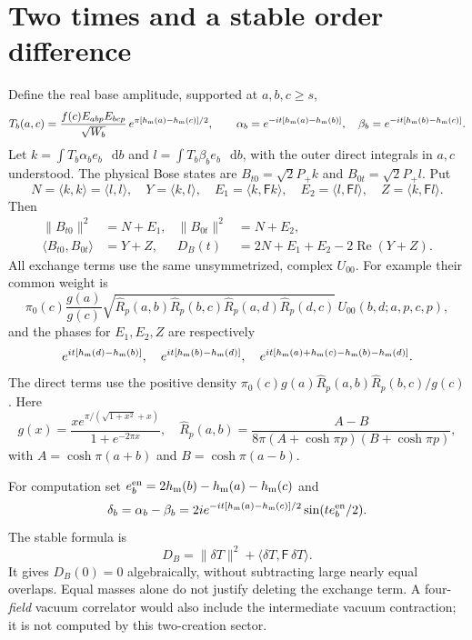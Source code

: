 \documentclass[11pt,a4paper]{article}
\newcommand{\dd}{\mathop{}\!\mathrm d}
\newcommand{\PP}{P_+}
\newcommand{\FF}{\mathsf F}
\newcommand{\hh}{h_{\rm m}}
\begin{document}
\section{Two times and a stable order difference}
Define the real base amplitude, supported at $a,b,c\ge s$,
\[
 T_b(a,c)=\frac{f(c)E_{abp}E_{bcp}}{\sqrt{W_b}}\,
       e^{\pi[\hh(a)-\hh(c)]/2},
 \qquad
 \alpha_b=e^{-it[\hh(a)-\hh(b)]},\quad
 \beta_b=e^{-it[\hh(b)-\hh(c)]}.
\]
Let $k=\int T_b\alpha_b e_b\,\dd b$ and
$l=\int T_b\beta_b e_b\,\dd b$, with the outer direct integrals in
$a,c$ understood. The physical Bose states are
$B_{t0}=\sqrt2\PP k$ and $B_{0t}=\sqrt2\PP l$.
Put
\[
 N=\langle k,k\rangle=\langle l,l\rangle,\quad
 Y=\langle k,l\rangle,\quad
 E_1=\langle k,\FF k\rangle,\quad E_2=\langle l,\FF l\rangle,\quad
 Z=\langle k,\FF l\rangle .
\]
Then
\begin{align}
 \|B_{t0}\|^2&=N+E_1,&
 \|B_{0t}\|^2&=N+E_2,\\
 \langle B_{t0},B_{0t}\rangle&=Y+Z,&
 D_B(t)&=2N+E_1+E_2-2\operatorname{Re}(Y+Z).
 \label{expanded}
\end{align}
All exchange terms use the same unsymmetrized, complex $U_{00}$.
For example their common weight is
\[
 \pi_0(c)\frac{g(a)}{g(c)}
 \sqrt{\widehat R_p(a,b)\widehat R_p(b,c)
       \widehat R_p(a,d)\widehat R_p(d,c)}\,U_{00}(b,d;a,p,c,p),
\]
and the phases for $E_1,E_2,Z$ are respectively
\[
 e^{it[\hh(d)-\hh(b)]},\quad e^{it[\hh(b)-\hh(d)]},\quad
 e^{it[\hh(a)+\hh(c)-\hh(b)-\hh(d)]}.
\]
The direct terms use the positive density
$\pi_0(c)g(a)\widehat R_p(a,b)\widehat R_p(b,c)/g(c)$.
Here
\[
 g(x)=\frac{x e^{\pi/(\sqrt{1+x^2}+x)}}{1+e^{-2\pi x}},\quad
 \widehat R_p(a,b)=
 \frac{A-B}{8\pi(A+\cosh\pi p)(B+\cosh\pi p)},
\]
with $A=\cosh\pi(a+b)$ and $B=\cosh\pi(a-b)$.

For computation set $e_b^{\rm en}=2\hh(b)-\hh(a)-\hh(c)$ and
\[
 \delta_b=\alpha_b-\beta_b
 =2i e^{-it[\hh(a)-\hh(c)]/2}
       \sin(te_b^{\rm en}/2).
\]
The stable formula is
\begin{equation}
 D_B=\|\delta T\|^2+\langle\delta T,\FF\,\delta T\rangle .
 \label{stable}
\end{equation}
It gives $D_B(0)=0$ algebraically, without subtracting large nearly
equal overlaps. Equal masses alone do not justify deleting the exchange
term. A four-\emph{field} vacuum correlator would also include the
intermediate vacuum contraction; it is not computed by this
two-creation sector.
\end{document}
